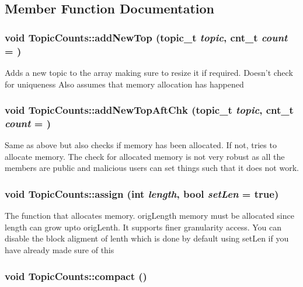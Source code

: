 \subsection{Member Function Documentation}
\hypertarget{struct_topic_counts_ad23a451d973f5a1a9ea3be5f24191568}{
\subsubsection[{addNewTop}]{\setlength{\rightskip}{0pt plus 5cm}void TopicCounts::addNewTop (topic\_\-t {\em topic}, \/  cnt\_\-t {\em count} = {})}}
\label{struct_topic_counts_ad23a451d973f5a1a9ea3be5f24191568}
Adds a new topic to the array making sure to resize it if required. Doesn't check for uniqueness Also assumes that memory allocation has happened \hypertarget{struct_topic_counts_a464225e562d192981988a8c2d412bd31}{
\subsubsection[{addNewTopAftChk}]{\setlength{\rightskip}{0pt plus 5cm}void TopicCounts::addNewTopAftChk (topic\_\-t {\em topic}, \/  cnt\_\-t {\em count} = {})}}
\label{struct_topic_counts_a464225e562d192981988a8c2d412bd31}
Same as above but also checks if memory has been allocated. If not, tries to allocate memory. The check for allocated memory is not very robust as all the members are public and malicious users can set things such that it does not work. \hypertarget{struct_topic_counts_a1c7c655d5af23b70a29e236d2814d6e0}{
\subsubsection[{assign}]{\setlength{\rightskip}{0pt plus 5cm}void TopicCounts::assign (int {\em length}, \/  bool {\em setLen} = {\ttfamily true})}}
\label{struct_topic_counts_a1c7c655d5af23b70a29e236d2814d6e0}
The function that allocates memory. origLength memory must be allocated since length can grow upto origLenth. It supports finer granularity access. You can disable the block aligment of lenth which is done by default using setLen if you have already made sure of this \hypertarget{struct_topic_counts_aa00483314f56e5c97f7feec15cf6dde2}{
\subsubsection[{compact}]{\setlength{\rightskip}{0pt plus 5cm}void TopicCounts::compact ()}}
